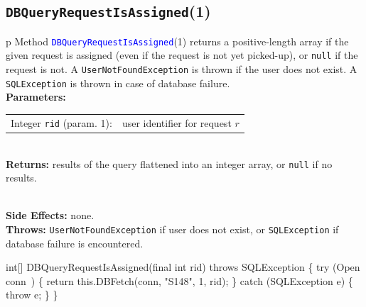\subsection{\texttt{DBQueryRequestIsAssigned}(1)}
\begin{tabular}{p{\textwidth}}
\toprule
{}
Method \textcolor{blue}{{\tt{}\protect{}DBQueryRequestIsAssigned}}(1) returns a
positive-length array if the given request is assigned (even if the request is
not yet picked-up), or {\tt{}null} if the request is not.  A
{\tt{}UserNotFoundException} is thrown if the user does not exist.
A {\tt{}SQLException} is thrown in case of database failure.\\
\midrule
\textbf{Parameters:} \\
\begin{tabular}{lp{116mm}}
Integer {\tt{}rid} (param. 1):&user identifier for request $r$
\end{tabular}\\
\textbf{Returns:} results of the query flattened into an integer array, or
{\tt{}null} if no results.

\\
\textbf{Side Effects:} none.\\
\textbf{Throws:} {\tt{}UserNotFoundException} if user does not exist, or
{\tt{}SQLException} if database failure is encountered.\\
\bottomrule
\end{tabular}
\nwenddocs{}\endmoddef{}
int[] DBQueryRequestIsAssigned(final int rid) throws SQLException \{
  try (\LA{}Open \code{}conn\edoc{}~{\nwtagstyle{}}\RA{}) \{
    return this.DBFetch(conn, "S148", 1, rid);
  \} catch (SQLException e) \{
    throw e;
  \}
\}
\eatline
{}\nwendcode{}\nwdocspar
